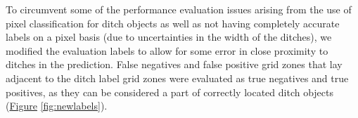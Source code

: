\documentclass[]{interact}
\theoremstyle{plain}%
\theoremstyle{definition}
\theoremstyle{remark}
\begin{document}
To circumvent some of the performance evaluation issues arising from the use of pixel classification for ditch objects as well as not having completely accurate labels on a pixel basis (due to uncertainties in the width of the ditches), we modified the evaluation labels to allow for some error in close proximity to ditches in the prediction. False negatives and false positive grid zones that lay adjacent to the ditch label grid zones were evaluated as true negatives and true positives, as they can be considered a part of correctly located ditch objects (\hyperref[fig:newlabels]{Figure} \ref{fig:newlabels}).

\begin{figure} [!htb]
    \centering
    \hspace{5pt}
    \subfigure[]{
}
\end{figure}
\end{document}
